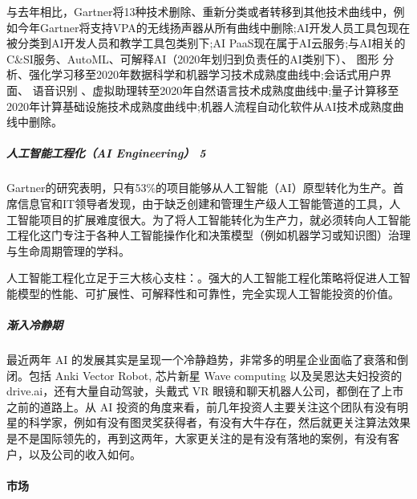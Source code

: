 \documentclass[letterpaper,11pt,english]{sphinxmanual}
\begin{document}
与去年相比，Gartner将13种技术删除、重新分类或者转移到其他技术曲线中，例如今年Gartner将支持VPA的无线扬声器从所有曲线中删除;AI开发人员工具包现在被分类到AI开发人员和教学工具包类别下;AI
PaaS现在属于AI云服务;与AI相关的C\&SI服务、AutoML、可解释AI（2020年划归到负责任的AI类别下）、
图形
分析、强化学习移至2020年数据科学和机器学习技术成熟度曲线中;会话式用户界面、
语音识别
、虚拟助理转至2020年自然语言技术成熟度曲线中;量子计算移至2020年计算基础设施技术成熟度曲线中;机器人流程自动化软件从AI技术成熟度曲线中删除。


\subparagraph{人工智能工程化（AI Engineering） 5\sphinxfootnotemark[639]}
\label{\detokenize{chapter_project/AI_industry_analysis:ai-engineering-5}}%
\begin{footnotetext}[639]\sphinxAtStartFootnote
{}
%
\end{footnotetext}\ignorespaces 
Gartner的研究表明，只有53\%的项目能够从人工智能（AI）原型转化为生产。首席信息官和IT领导者发现，由于缺乏创建和管理生产级人工智能管道的工具，人工智能项目的扩展难度很大。为了将人工智能转化为生产力，就必须转向人工智能工程化这门专注于各种人工智能操作化和决策模型（例如机器学习或知识图）治理与生命周期管理的学科。

人工智能工程化立足于三大核心支柱：。强大的人工智能工程化策略将促进人工智能模型的性能、可扩展性、可解释性和可靠性，完全实现人工智能投资的价值。


\subparagraph{渐入冷静期}
\label{\detokenize{chapter_project/AI_industry_analysis:id3}}
最近两年 AI
的发展其实是呈现一个冷静趋势，非常多的明星企业面临了衰落和倒闭。包括
Anki Vector Robot, 芯片新星 Wave computing 以及吴恩达夫妇投资的
drive.ai，还有大量自动驾驶，头戴式 VR
眼镜和聊天机器人公司，都倒在了上市之前的道路上。从 AI
投资的角度来看，前几年投资人主要关注这个团队有没有明星的科学家，例如有没有图灵奖获得者，有没有大牛存在，然后就更关注算法效果是不是国际领先的，再到这两年，大家更关注的是有没有落地的案例，有没有客户，以及公司的收入如何。%
\begin{footnote}[640]\sphinxAtStartFootnote
{}
%
\end{footnote}


\paragraph{市场}
\label{\detokenize{chapter_project/AI_industry_analysis:id4}}
\end{document}
